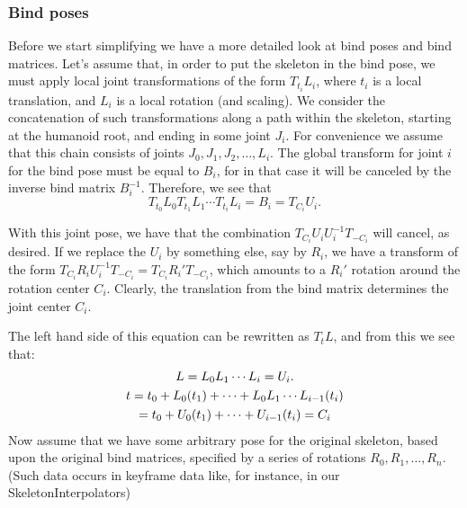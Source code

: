 \subsubsection{Bind poses}
Before we start simplifying we have a more detailed look at bind poses and bind matrices.
Let's assume that, in order to put the skeleton in the bind pose, we must apply
local joint transformations of the form $T_{t_i} L_i$, where $t_i$ is a local translation, and $L_i$ is a local
rotation (and scaling).
We consider the concatenation of such transformations along a path within the skeleton, starting at
the humanoid root, and ending in some joint $J_i$.
For convenience we assume that this chain consists of joints $J_0, J_1, J_2, \ldots, L_i$.
The  global transform for  joint $i$ for the bind pose  must be equal to $B_i$, for in that case it will be canceled by the inverse bind matrix $B_i^{-1}$.
 Therefore, we see that
 \[ T_{t_0} L_0 T_{t_1} L_1 \cdots T_{t_i} L_i = B_i = T_{C_i} U_i.\]

 With this joint pose, we have that the combination $T_{C_i} U_i U_i^{-1} T_{-C_i}$
 will cancel, as desired. If we replace the $U_i$ by something else, say by $R_i$,
 we have a transform of the form $T_{C_i} R_i U_i^{-1} T_{-C_i} = T_{C_i} R_i' T_{-C_i}$,
 which amounts to a $R_i'$ rotation around the rotation center $C_i$.
 Clearly, the translation from the bind matrix determines the joint center $C_i$.

%
The left hand side of this equation can be rewritten as $T_t L$, and from this we see that:
\begin{gather}
 L = L_0 L_1\cdots L_i = U_i. \notag \\
 t = t_0 + L_0(t_1) + \cdots + L_0 L_1\cdots L_{i-1}(t_i) \notag\\
  = t_0 + U_0(t_1) + \cdots + U_{i-1}(t_i) = C_i \notag
\end{gather}
%
Now assume that we have some arbitrary pose for the original skeleton,
based upon the original bind matrices,
specified by a series of rotations $R_0, R_1, \ldots, R_n$.
(Such data occurs in keyframe data like, for instance, in our SkeletonInterpolators)

